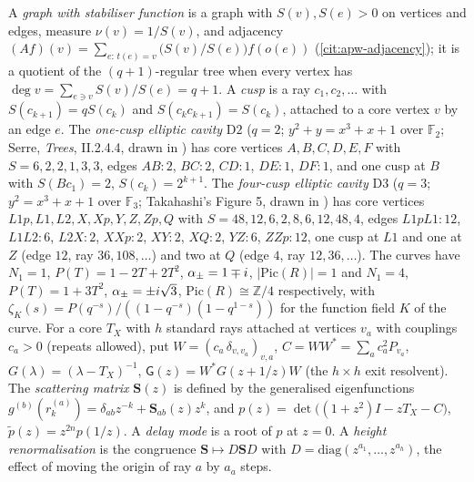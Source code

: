 \begin{definition}
\label{def:elliptic-cavity}
A \emph{graph with stabiliser function} is a graph with $S(v),S(e)>0$ on vertices and edges, measure
$\nu(v) = 1/S(v)$, and adjacency $(Af)(v) = \sum_{e:\,t(e)=v}\big(S(v)/S(e)\big)f(o(e))$
(\cref{cit:apw-adjacency}); it is a quotient of the $(q+1)$-regular tree when every vertex has
$\deg v = \sum_{e\ni v}S(v)/S(e) = q+1$. A \emph{cusp} is a ray $c_1,c_2,\dots$ with $S(c_{k+1}) = qS(c_k)$ and
$S(c_kc_{k+1}) = S(c_k)$, attached to a core vertex $v$ by an edge $e$. The \emph{one-cusp elliptic cavity}
$\mathrm{D2}$ ($q = 2$; $y^2+y = x^3+x+1$ over $\mathbb F_2$; Serre, \emph{Trees}, II.2.4.4, drawn in
\cite{arends2026resonances}) has core vertices $A,B,C,D,E,F$ with $S = 6,2,2,1,3,3$, edges $AB{:}2$, $BC{:}2$,
$CD{:}1$, $DE{:}1$, $DF{:}1$, and one cusp at $B$ with $S(Bc_1) = 2$, $S(c_k) = 2^{k+1}$. The \emph{four-cusp
elliptic cavity} $\mathrm{D3}$ ($q = 3$; $y^2 = x^3+x+1$ over $\mathbb F_3$; Takahashi's Figure 5, drawn in
\cite{arends2026resonances}) has core vertices $L1p,L1,L2,X,Xp,Y,Z,Zp,Q$ with $S = 48,12,6,2,8,6,12,48,4$,
edges $L1pL1{:}12$, $L1L2{:}6$, $L2X{:}2$, $XXp{:}2$, $XY{:}2$, $XQ{:}2$, $YZ{:}6$, $ZZp{:}12$, one cusp at $L1$ and one
at $Z$ (edge $12$, ray $36,108,\dots$) and two at $Q$ (edge $4$, ray $12,36,\dots$). The curves have
$N_1 = 1$, $P(T) = 1-2T+2T^2$, $\alpha_{\pm} = 1\mp i$, $|\mathrm{Pic}(R)| = 1$ and $N_1 = 4$, $P(T) = 1+3T^2$,
$\alpha_{\pm} = \pm i\sqrt3$, $\mathrm{Pic}(R)\cong\mathbb Z/4$ respectively, with
$\zeta_K(s) = P(q^{-s})/((1-q^{-s})(1-q^{1-s}))$ for the function field $K$ of the curve.
For a core $T_X$ with $h$ standard rays attached at vertices $v_a$ with couplings $c_a>0$ (repeats allowed),
put $W = (c_a\,\delta_{v,v_a})_{v,a}$, $C = WW^{*} = \sum_a c_a^2P_{v_a}$, $G(\lambda) = (\lambda-T_X)^{-1}$,
$\mathsf G(z) = W^{*}G(z+1/z)W$ (the $h\times h$ exit resolvent). The \emph{scattering matrix} $\mathbf S(z)$ is
defined by the generalised eigenfunctions $g^{(b)}(r^{(a)}_k) = \delta_{ab}z^{-k}+\mathbf S_{ab}(z)z^{k}$, and
$p(z) = \det\big((1+z^2)I-zT_X-C\big)$, $\tilde p(z) = z^{2n}p(1/z)$. A \emph{delay mode} is a root of $p$ at
$z = 0$. A \emph{height renormalisation} is the congruence $\mathbf S\mapsto D\mathbf S D$ with
$D = \mathrm{diag}(z^{a_1},\dots,z^{a_h})$, the effect of moving the origin of ray $a$ by $a_a$ steps.
\end{definition}

